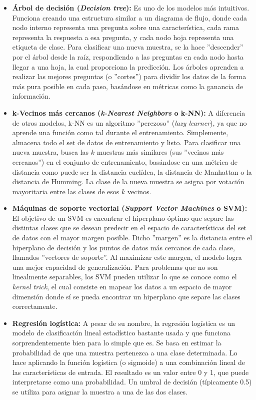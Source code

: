 \begin{itemize}
	\item \textbf{Árbol de decisión (\textit{Decision tree}):} Es uno de los modelos más intuitivos. Funciona creando una estructura similar a un diagrama de flujo, donde cada nodo interno representa una pregunta sobre una característica, cada rama representa la respuesta a esa pregunta, y cada nodo hoja representa una etiqueta de clase. Para clasificar una nueva muestra, se la hace ''descender'' por el árbol desde la raíz, respondiendo a las preguntas en cada nodo hasta llegar a una hoja, la cual proporciona la predicción. Los árboles aprenden a realizar las mejores preguntas (o ''cortes'') para dividir los datos de la forma más pura posible en cada paso, basándose en métricas como la ganancia de información.
	
	\item \textbf{k-Vecinos más cercanos (\textit{k-Nearest Neighbors} o k-NN):} A diferencia de otros modelos, k-NN es un algoritmo ''perezoso'' (\textit{lazy learner}), ya que no aprende una función como tal durante el entrenamiento. Simplemente, almacena todo el set de datos de entrenamiento y listo. Para clasificar una nueva muestra, busca las $k$ muestras más similares (sus ''vecinos más cercanos'') en el conjunto de entrenamiento, basándose en una métrica de distancia como puede ser la distancia euclídea, la distancia de Manhattan o la distancia de Humming. La clase de la nueva muestra se asigna por votación mayoritaria entre las clases de esos $k$ vecinos.
	
	\item \textbf{Máquinas de soporte vectorial (\textit{Support Vector Machines} o SVM):} El objetivo de un SVM es encontrar el hiperplano óptimo que separe las distintas clases que se desean predecir en el espacio de características del set de datos con el mayor margen posible. Dicho ''margen'' es la distancia entre el hiperplano de decisión y los puntos de datos más cercanos de cada clase, llamados ''vectores de soporte''. Al maximizar este margen, el modelo logra una mejor capacidad de generalización. Para problemas que no son linealmente separables, los SVM pueden utilizar lo que se conoce como el \textit{kernel trick}, el cual consiste en mapear los datos a un espacio de mayor dimensión donde sí se pueda encontrar un hiperplano que separe las clases correctamente.

	\item \textbf{Regresión logística:} A pesar de su nombre, la regresión logística es un modelo de clasificación lineal estadístico bastante usada y que funciona sorprendentemente bien para lo simple que es. Se basa en estimar la probabilidad de que una muestra pertenezca a una clase determinada. Lo hace aplicando la función logística (o sigmoide) a una combinación lineal de las características de entrada. El resultado es un valor entre 0 y 1, que puede interpretarse como una probabilidad. Un umbral de decisión (típicamente 0.5) se utiliza para asignar la muestra a una de las dos clases.
\end{itemize}

